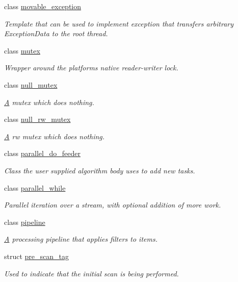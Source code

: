 \begin{DoxyCompactItemize}
class \hyperlink{classtbb_1_1movable__exception}{movable\+\_\+exception}
\begin{DoxyCompactList}\small\item\em Template that can be used to implement exception that transfers arbitrary Exception\+Data to the root thread. \end{DoxyCompactList}\item 
class \hyperlink{classtbb_1_1mutex}{mutex}
\begin{DoxyCompactList}\small\item\em Wrapper around the platform\textquotesingle{}s native reader-\/writer lock. \end{DoxyCompactList}\item 
class \hyperlink{classtbb_1_1null__mutex}{null\+\_\+mutex}
\begin{DoxyCompactList}\small\item\em \hyperlink{structA}{A} mutex which does nothing. \end{DoxyCompactList}\item 
class \hyperlink{classtbb_1_1null__rw__mutex}{null\+\_\+rw\+\_\+mutex}
\begin{DoxyCompactList}\small\item\em \hyperlink{structA}{A} rw mutex which does nothing. \end{DoxyCompactList}\item 
class \hyperlink{classtbb_1_1parallel__do__feeder}{parallel\+\_\+do\+\_\+feeder}
\begin{DoxyCompactList}\small\item\em Class the user supplied algorithm body uses to add new tasks. \end{DoxyCompactList}\item 
class \hyperlink{classtbb_1_1parallel__while}{parallel\+\_\+while}
\begin{DoxyCompactList}\small\item\em Parallel iteration over a stream, with optional addition of more work. \end{DoxyCompactList}\item 
class \hyperlink{classtbb_1_1pipeline}{pipeline}
\begin{DoxyCompactList}\small\item\em \hyperlink{structA}{A} processing pipeline that applies filters to items. \end{DoxyCompactList}\item 
struct \hyperlink{structtbb_1_1pre__scan__tag}{pre\+\_\+scan\+\_\+tag}
\begin{DoxyCompactList}\small\item\em Used to indicate that the initial scan is being performed. \end{DoxyCompactList}\item 

\end{DoxyCompactItemize}
